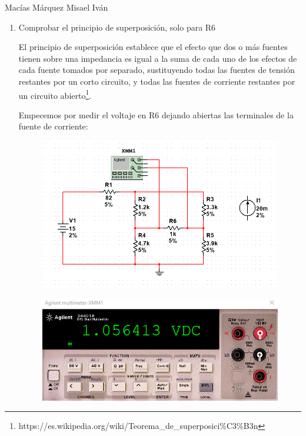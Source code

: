 \documentclass[12pt,a4paper]{article}
\begin{document}
Macías Márquez Misael Iván

\begin{enumerate}






\item Comprobar el principio de superposición, solo para R6

El principio de superposición establece que el efecto que dos o más fuentes tienen sobre una impedancia es igual a la suma de cada uno de los efectos de cada fuente tomados por separado, sustituyendo todas las fuentes de tensión restantes por un corto circuito, y todas las fuentes de corriente restantes por un circuito abierto\footnote{https://es.wikipedia.org/wiki/Teorema\_de\_superposici\%C3\%B3n}.

Empecemos por medir el voltaje en R6 dejando abiertas las terminales de la fuente de corriente:

\begin{figure}[h!]
    \centering
    \includegraphics[scale=0.4]{1,a.PNG}

    \label{fig:my_label}
\end{figure}

\begin{figure}[h!]
    \centering
    \includegraphics[scale=0.5]{1.a.multi.PNG}


\end{figure}
\end{enumerate}
\end{document}
